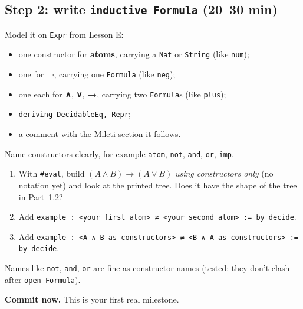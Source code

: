 \documentclass[11pt,a4paper]{article}
\newcommand{\code}[1]{\texttt{#1}}
\begin{document}
\subsection{Step 2: write \texttt{inductive Formula} (20--30 min)}
Model it on \code{Expr} from Lesson E:
\begin{itemize}
\item one constructor for \textbf{atoms}, carrying a \code{Nat} or \code{String} (like \code{num});
\item one for \textbf{¬}, carrying one \code{Formula} (like \code{neg});
\item one each for \textbf{∧}, \textbf{∨}, \textbf{→}, carrying two \code{Formula}s (like \code{plus});
\item \code{deriving DecidableEq, Repr};
\item a comment with the Mileti section it follows.
\end{itemize}
Name constructors clearly, for example \code{atom}, \code{not}, \code{and}, \code{or}, \code{imp}.
\begin{okbox}
\begin{enumerate}
\item With \code{\#eval}, build $(A\wedge B)\to(A\vee B)$ \emph{using constructors only} (no notation yet) and look at the printed tree. Does it have the shape of the tree in Part~1.2?
\item Add \code{example : <your first atom> ≠ <your second atom> := by decide}.
\item Add \code{example : <A ∧ B as constructors> ≠ <B ∧ A as constructors> := by decide}.
\end{enumerate}
\end{okbox}
\begin{tip}[Names]
Names like \code{not}, \code{and}, \code{or} are fine as constructor names (tested: they don't clash after \code{open Formula}).
\end{tip}
\textbf{Commit now.} This is your first real milestone.
\end{document}
